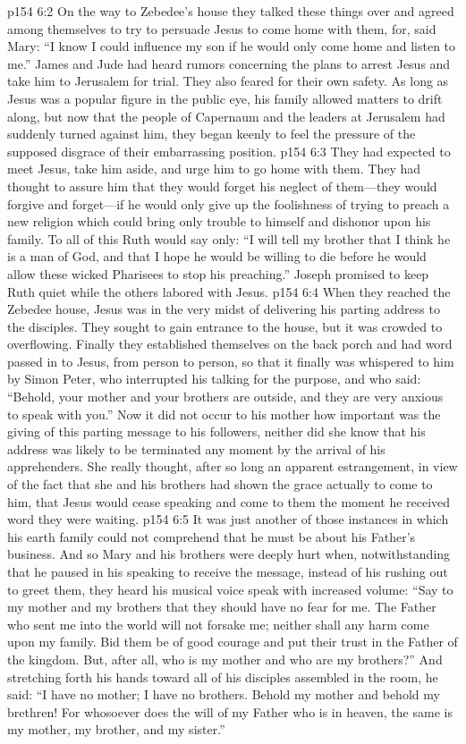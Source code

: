 \vs p154 6:2 On the way to Zebedee’s house they talked these things over and agreed among themselves to try to persuade Jesus to come home with them, for, said Mary: “I know I could influence my son if he would only come home and listen to me.” James and Jude had heard rumors concerning the plans to arrest Jesus and take him to Jerusalem for trial. They also feared for their own safety. As long as Jesus was a popular figure in the public eye, his family allowed matters to drift along, but now that the people of Capernaum and the leaders at Jerusalem had suddenly turned against him, they began keenly to feel the pressure of the supposed disgrace of their embarrassing position.
\vs p154 6:3 They had expected to meet Jesus, take him aside, and urge him to go home with them. They had thought to assure him that they would forget his neglect of them---they would forgive and forget---if he would only give up the foolishness of trying to preach a new religion which could bring only trouble to himself and dishonor upon his family. To all of this Ruth would say only: “I will tell my brother that I think he is a man of God, and that I hope he would be willing to die before he would allow these wicked Pharisees to stop his preaching.” Joseph promised to keep Ruth quiet while the others labored with Jesus.
\vs p154 6:4 When they reached the Zebedee house, Jesus was in the very midst of delivering his parting address to the disciples. They sought to gain entrance to the house, but it was crowded to overflowing. Finally they established themselves on the back porch and had word passed in to Jesus, from person to person, so that it finally was whispered to him by Simon Peter, who interrupted his talking for the purpose, and who said: “Behold, your mother and your brothers are outside, and they are very anxious to speak with you.” Now it did not occur to his mother how important was the giving of this parting message to his followers, neither did she know that his address was likely to be terminated any moment by the arrival of his apprehenders. She really thought, after so long an apparent estrangement, in view of the fact that she and his brothers had shown the grace actually to come to him, that Jesus would cease speaking and come to them the moment he received word they were waiting.
\vs p154 6:5 It was just another of those instances in which his earth family could not comprehend that he must be about his Father’s business. And so Mary and his brothers were deeply hurt when, notwithstanding that he paused in his speaking to receive the message, instead of his rushing out to greet them, they heard his musical voice speak with increased volume: \textcolor{ubdarkred}{“Say to my mother and my brothers that they should have no fear for me. The Father who sent me into the world will not forsake me; neither shall any harm come upon my family. Bid them be of good courage and put their trust in the Father of the kingdom. But, after all, who is my mother and who are my brothers?”} And stretching forth his hands toward all of his disciples assembled in the room, he said: \textcolor{ubdarkred}{“I have no mother; I have no brothers. Behold my mother and behold my brethren! For whosoever does the will of my Father who is in heaven, the same is my mother, my brother, and my sister.”}
